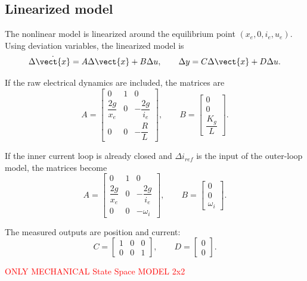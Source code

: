 \subsection{Linearized model}

The nonlinear model is linearized around the equilibrium point $\left(x_e,0,i_e,u_e\right)$. Using deviation variables, the linearized model is
\begin{equation}
    \Delta\dot{\vect{x}} = A\Delta\vect{x} + B\Delta u,
    \qquad
    \Delta y = C\Delta\vect{x} + D\Delta u.
    \label{eq:linear_ss_general}
\end{equation}

If the raw electrical dynamics are included, the matrices are
\begin{equation}
A =
\begin{bmatrix}
0 & 1 & 0 \\
\dfrac{2g}{x_e} & 0 & -\dfrac{2g}{i_e} \\
0 & 0 & -\dfrac{R}{L}
\end{bmatrix},
\qquad
B =
\begin{bmatrix}
0 \\
0 \\
\dfrac{K_g}{L}
\end{bmatrix}.
\label{eq:linear_matrices_voltage}
\end{equation}

If the inner current loop is already closed and $\Delta i_{ref}$ is the input of the outer-loop model, the matrices become
\begin{equation}
A =
\begin{bmatrix}
0 & 1 & 0 \\
\dfrac{2g}{x_e} & 0 & -\dfrac{2g}{i_e} \\
0 & 0 & -\omega_i
\end{bmatrix},
\qquad
B =
\begin{bmatrix}
0 \\
0 \\
\omega_i
\end{bmatrix}.
\label{eq:linear_matrices_current_loop}
\end{equation}

The measured outputs are position and current:
\begin{equation}
    C =
    \begin{bmatrix}
        1 & 0 & 0 \\
        0 & 0 & 1
    \end{bmatrix},
    \qquad
    D =
    \begin{bmatrix}
        0 \\
        0
    \end{bmatrix}.
    \label{eq:output_matrix}
\end{equation}

\textcolor{red}{ONLY MECHANICAL State Space MODEL 2x2}
